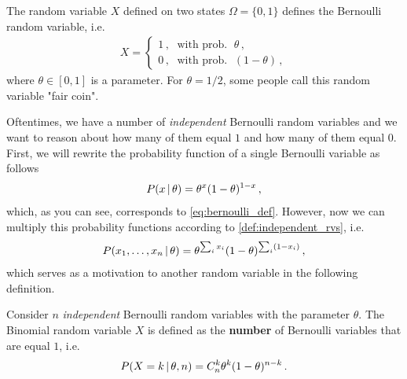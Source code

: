 \begin{mybox}
\begin{definition}\label{def:bern_rv}
    The random variable $X$ defined on two states $\Omega = \{0,1\}$  defines the Bernoulli random variable, i.e.
    \begin{align}
        X = \begin{cases}
            1\,, \; \text{ with prob. } \; \theta\,,\\
            0\,, \; \text{ with prob. } \; (1-\theta)\,,
        \end{cases}
        \label{eq:bernoulli_def}
    \end{align}
    where $\theta \in [0,1]$ is a parameter. For $\theta=1/2$, some people call this random variable "fair coin".
\end{definition}
\end{mybox}

Oftentimes, we have a number of \textit{independent} Bernoulli random variables and we want to reason about how many of them equal $1$ and how many of them equal $0$.
First, we will rewrite the probability function of a single Bernoulli variable as follows
\begin{align}
    P(x\,|\, \theta) = \theta^x (1-\theta)^{1-x}\,,
\end{align}
which, as you can see, corresponds to \cref{eq:bernoulli_def}.
However, now we can multiply this probability functions according to \cref{def:independent_rvs}, i.e.
\begin{align}
    P(x_1,\ldots,x_n\,|\, \theta) = \theta^{\sum_i x_i} (1-\theta)^{\sum_i (1-x_i)}\,,
\end{align}
which serves as a motivation to another random variable in the following definition.

\begin{mybox}
\begin{definition}\label{def:binomial_rv}
    Consider $n$ \textit{independent} Bernoulli random variables with the parameter $\theta$. The Binomial random variable $X$ is defined as the \textbf{number} of Bernoulli variables that are equal $1$, i.e.
    \begin{align}
        P(X = k \,|\, \theta, n) = C_n^k \theta^k (1-\theta)^{n-k}\,.
    \end{align}
\end{definition}
\end{mybox}

